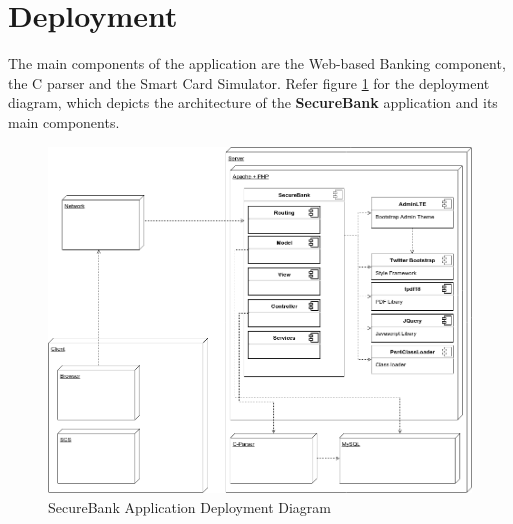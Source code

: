 \section{Deployment}

The main components of the application are the Web-based Banking component, the C parser and the Smart Card Simulator.
Refer figure \ref{fig:deployment} for the deployment diagram, which depicts the architecture of the \textbf{SecureBank} application and its main components.

\begin{figure}[ht]
	\centering
	\includegraphics[width=.8\linewidth]{figures/deployment.png}
	\caption{SecureBank Application Deployment Diagram}
	\label{fig:deployment}
\end{figure}

\clearpage